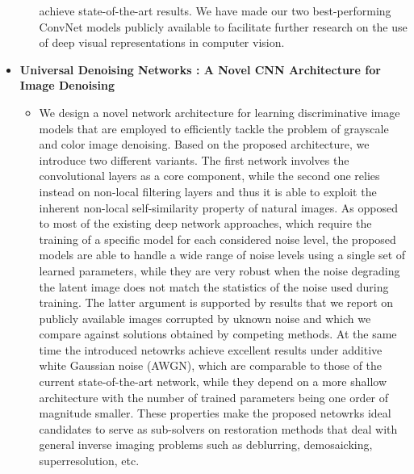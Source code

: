 \documentclass[12pt]{article}
\begin{document}
\begin{itemize}
\begin{itemize}
    achieve state-of-the-art results. We have made our two best-performing
    ConvNet models publicly available to facilitate further research on the
    use of deep visual representations in computer vision.
  \end{itemize}
\item \textbf{Universal Denoising Networks : A Novel CNN Architecture for
  Image Denoising} \cite{DBLP:journals/corr/abs-1711-07807}
  \begin{itemize}
  \item We design a novel network architecture for learning discriminative
    image models that are employed to efficiently tackle the problem of
    grayscale and color image denoising. Based on the proposed architecture,
    we introduce two different variants. The first network involves the
    convolutional layers as a core component, while the second one relies
    instead on non-local filtering layers and thus it is able to exploit the
    inherent non-local self-similarity property of natural images. As
    opposed to most of the existing deep network approaches, which require the
    training of a specific model for each considered noise level, the
    proposed models are able to handle a wide range of noise levels using a
    single set of learned parameters, while they are very robust when the
    noise degrading the latent image does not match the statistics of the noise
    used during training. The latter argument is supported by results that we
    report on publicly available images corrupted by uknown noise and which we
    compare against solutions obtained by competing methods. At the same
    time the introduced netowrks achieve excellent results under additive white
    Gaussian noise (AWGN), which are comparable to those of the current
    state-of-the-art network, while they depend on a more shallow architecture
    with the number of trained parameters being one order of magnitude
    smaller. These properties make the proposed netowrks ideal candidates to
    serve as sub-solvers on restoration methods that deal with general
    inverse imaging problems such as deblurring, demosaicking, superresolution,
    etc.
  \end{itemize}
  \end{itemize}






\end{document}
